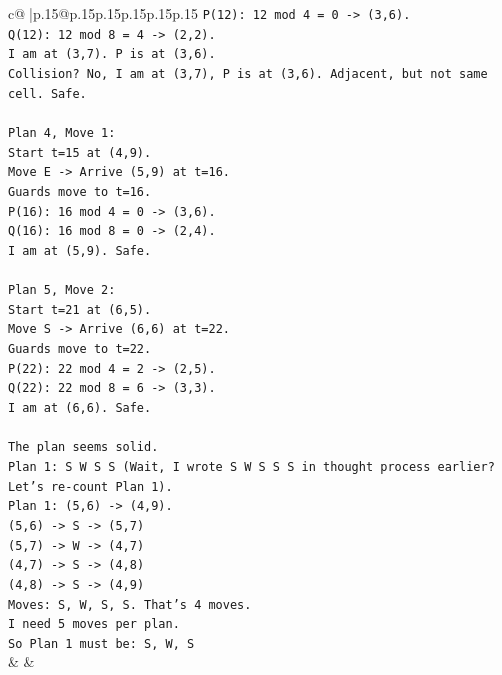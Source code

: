 \documentclass{article}
\begin{document}
{\begin{supertabular}{c@{$\;$}|p{.15\linewidth}@{}p{.15\linewidth}p{.15\linewidth}p{.15\linewidth}p{.15\linewidth}p{.15\linewidth}}
{{{\texttt{P(12): 12 mod 4 = 0 {-}> (3,6).} \\
\texttt{Q(12): 12 mod 8 = 4 {-}> (2,2).} \\
\texttt{I am at (3,7). P is at (3,6).} \\
\texttt{Collision? No, I am at (3,7), P is at (3,6). Adjacent, but not same cell. Safe.} \\
\\ 
\texttt{Plan 4, Move 1:} \\
\texttt{Start t=15 at (4,9).} \\
\texttt{Move E {-}> Arrive (5,9) at t=16.} \\
\texttt{Guards move to t=16.} \\
\texttt{P(16): 16 mod 4 = 0 {-}> (3,6).} \\
\texttt{Q(16): 16 mod 8 = 0 {-}> (2,4).} \\
\texttt{I am at (5,9). Safe.} \\
\\ 
\texttt{Plan 5, Move 2:} \\
\texttt{Start t=21 at (6,5).} \\
\texttt{Move S {-}> Arrive (6,6) at t=22.} \\
\texttt{Guards move to t=22.} \\
\texttt{P(22): 22 mod 4 = 2 {-}> (2,5).} \\
\texttt{Q(22): 22 mod 8 = 6 {-}> (3,3).} \\
\texttt{I am at (6,6). Safe.} \\
\\ 
\texttt{The plan seems solid.} \\
\texttt{Plan 1: S W S S (Wait, I wrote S W S S S in thought process earlier? Let's re{-}count Plan 1).} \\
\texttt{Plan 1: (5,6) {-}> (4,9).} \\
\texttt{(5,6) {-}> S {-}> (5,7)} \\
\texttt{(5,7) {-}> W {-}> (4,7)} \\
\texttt{(4,7) {-}> S {-}> (4,8)} \\
\texttt{(4,8) {-}> S {-}> (4,9)} \\
\texttt{Moves: S, W, S, S. That's 4 moves.} \\
\texttt{I need 5 moves per plan.} \\
\texttt{So Plan 1 must be: S, W, S} \\
            }
        }
    }
    & & \\ \\


\end{supertabular}}
\end{document}
